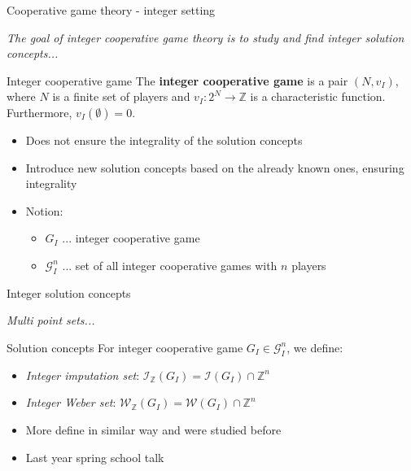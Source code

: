 \documentclass{beamer}
\newcommand{\Z}{\mathbb{Z}}
\begin{document}
\begin{frame}{Cooperative game theory - integer setting}
    \pause

    \textit{The goal of integer cooperative game theory is to study and find integer solution concepts...}

    \pause

    \begin{block}{Integer cooperative game}
        \pause
        The \textbf{integer cooperative game} is a pair $(N, v_I)$, where $N$ is a finite set of players and $v_I: 2^N \to \Z$ is a characteristic function.
        Furthermore, $v_I(\emptyset) = 0$.
    \end{block}

    \pause

    \begin{itemize}
        \item Does not ensure the integrality of the solution concepts
        \pause
        \item Introduce new solution concepts based on the already known ones, ensuring integrality
        \pause
        \item Notion:
        \pause
        \begin{itemize}
            \item $G_I$ ... integer cooperative game
            \pause
            \item $\mathcal{G}_I^n$ ... set of all integer cooperative games with $n$ players
        \end{itemize}
    \end{itemize}

\end{frame}



\begin{frame}{Integer solution concepts}
    \pause

    \textit{Multi point sets...}

    \pause

    \begin{block}{Solution concepts}
        \pause
        For integer cooperative game $G_I \in \mathcal{G}_I^n$, we define:
        \begin{itemize}
            \pause
            \item \emph{Integer imputation set}: $\mathcal{I}_{\Z}(G_I) = \mathcal{I}(G_I) \cap \Z^{n}$
            \pause
            \item \emph{Integer Weber set}: $\mathcal{W}_{\Z}(G_I) = \mathcal{W}(G_I) \cap \Z^{n}$
        \end{itemize}
    \end{block}

    \pause
    \begin{itemize}
        \item More define in similar way and were studied before
        \pause
        \item Last year spring school talk
    \end{itemize}

\end{frame}
\end{document}
